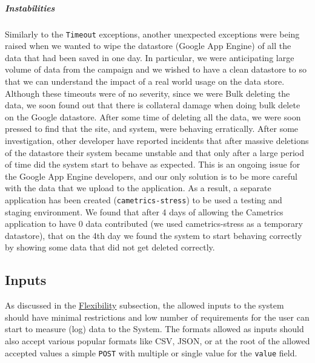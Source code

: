 \documentclass[10pt,a4paper,english]{article}
\begin{document}

\hypertarget{instabilities}{}
\subparagraph*{Instabilities}
\label{instabilities}

Similarly to the \texttt{Timeout} exceptions, another unexpected exceptions were being raised when we wanted to wipe the datastore (Google App Engine) of all the data that had been saved in one day. In particular, we were anticipating large volume of data from the campaign and we wished to have a clean datastore to so that we can understand the impact of a real world usage on the data store. Although these timeouts were of no severity, since we were Bulk deleting the data, we soon found out that there is collateral damage when doing bulk delete on the Google datastore. After some time of deleting all the data, we were soon pressed to find that the site, and system, were behaving erratically. After some investigation, other developer have reported incidents that after massive deletions of the datastore their system became unstable and that only after a large period of time did the system start to behave as expected. This is an ongoing issue for the Google App Engine developers, and our only solution is to be more careful with the data that we upload to the application. As a result, a separate application has been created (\texttt{cametrics-stress}) to be used a testing and staging environment. We found that after 4 days of allowing the Cametrics application to have 0 data contributed (we used cametrics-stress as a temporary datastore), that on the 4th day we found the system to start behaving correctly by showing some data that did not get deleted correctly.



\hypertarget{inputs}{}
\subsection*{Inputs}
\label{inputs}

As discussed in the \href{\#flexibility}{Flexibility} subsection, the allowed inputs to the system should have minimal restrictions and low number of requirements for the user can start to measure (log) data to the System. The formats allowed as inputs should also accept various popular formats like CSV, JSON, or at the root of the allowed accepted values a simple \texttt{POST} with multiple or single value for the \texttt{value} field.
\end{document}
